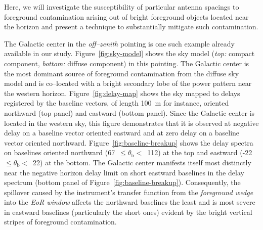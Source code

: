 \documentclass[preprint2,iop,numberedappendix]{emulateapj}
\begin{document}

Here, we will investigate the susceptibility of particular antenna spacings to foreground contamination arising out of bright foreground objects located near the horizon and present a technique to substantially mitigate such contamination.

The Galactic center in the {\it off--zenith} pointing is one such example already available in our study. Figure~\ref{fig:sky-model} shows the sky model ({\it top:} compact component, {\it bottom:} diffuse component) in this pointing. The Galactic center is the most dominant source of foreground contamination from the diffuse sky model and is co--located with a bright secondary lobe of the power pattern near the western horizon. Figure~\ref{fig:delay-map} shows the sky mapped to delays registered by the baseline vectors, of length 100~m for instance, oriented northward (top panel) and eastward (bottom panel). Since the Galactic center is located in the western sky, this figure demonstrates that it is observed at negative delay on a baseline vector oriented eastward and at zero delay on a baseline vector oriented northward. Figure~\ref{fig:baseline-breakup} shows the delay spectra on baselines oriented northward (67~$\le \theta_\textrm{b} <$~112) at the top and eastward (-22~$\le \theta_\textrm{b} <$~22) at the bottom. The Galactic center manifests itself most distinctly near the negative horizon delay limit on short eastward baselines in the delay spectrum (bottom panel of Figure~\ref{fig:baseline-breakup}). Consequently, the spillover caused by the instrument's transfer function from the {\it foreground wedge} into the {\it EoR window} affects the northward baselines the least and is most severe in eastward baselines (particularly the short ones) evident by the bright vertical stripes of foreground contamination. 
\end{document}
